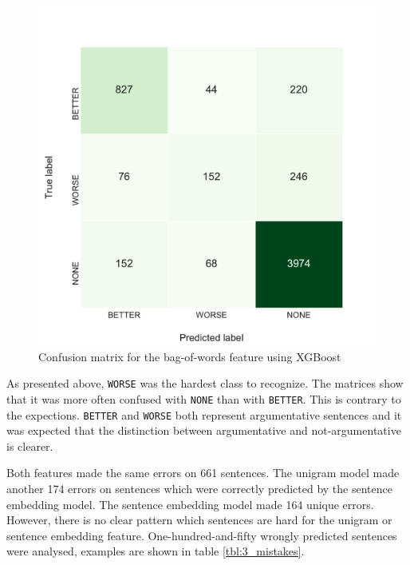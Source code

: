 \begin{figure}[h]
\begin{minipage}{.5\linewidth}
     \caption{Confusion matrix for the bag-of-words feature using XGBoost} 
       \label{fig:3_conf_uni}
 \centering
	\includegraphics[width=1\linewidth]{images/experiments/conf-Bag-Of-Words_False}
    \end{minipage} 
\end{figure}

As presented above, \texttt{WORSE} was the hardest class to recognize. The matrices show that it was more often confused with \texttt{NONE} than with \texttt{BETTER}. This is contrary to the expections. \texttt{BETTER} and \texttt{WORSE} both represent argumentative sentences and it was expected that the distinction between argumentative and not-argumentative is clearer. 

Both features made the same errors on 661 sentences. The unigram model made another 174 errors on sentences which were correctly predicted by the sentence embedding model. The sentence embedding model made 164 unique errors. However, there is no clear pattern which sentences are hard for the unigram or sentence embedding feature. One-hundred-and-fifty wrongly predicted sentences were analysed, examples are shown in table \ref{tbl:3_mistakes}. 

